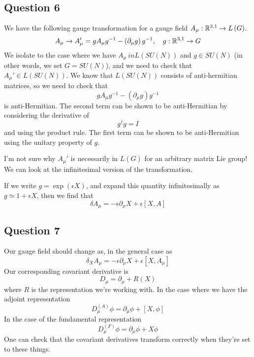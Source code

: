 \pagebreak 
\subsection{Question 6}
We have the following 
gauge transformation for a gauge field $ A _ \mu  : \mathbb{R} ^{ 3, 1 } \to L \left( G  \right)  $. 
\[
	A_ \mu \to A _ \mu  '  = g A _ \mu g ^{ - 1 }  - \left(  \partial  _ \mu g  \right)  g ^{ - 1 }, 
	\quad g : \mathbb{R} ^{ 3, 1 } \to  G 
\] We isolate to the case where 
we have $ A_ \mu   \ in L ( SU ( N ))$ and $ g \in SU ( N )  $ (in other words, 
we set $ G  = SU (N )$), and we need to 
check that $ A_ \mu  ' \in L \left(  SU ( N )  \right)   $. 
We know that $ L \left(  SU \left(  N   \right)   \right)  $ 
consists of anti-hermitian matrices, so we need to check that 
\[
  g A _ \mu g ^{ - 1 }  - \left(  \partial  _ \mu g  \right)  g ^{ - 1 } 
\] is anti-Hermitian. The second term can be shown to be 
anti-Hermitian by considering the derivative of 
\[
 g ^\dagger g  = I  
\] and using the product rule. The first term can 
be shown to be anti-Hermitian using the unitary 
property of $ g $. 

I'm not sure why $ A_ \mu  ' $ is necessarily in 
$ L \left(  G  \right) $ for an arbitrary matrix 
Lie group! We can look at the infinitesimal 
version of the transformation. 

If we write $ g  = \exp\left(  \epsilon  X  \right)  $, 
and expand this quantity infinitesimally as $ g 
\simeq 1  + \epsilon   X $, then we find that 
\[
\delta A _ \mu  =  - \epsilon \partial  _ \mu X + \epsilon \left[  X, A  \right] 
\] 

\pagebreak

\subsection{Question 7}
Our gauge field should 
change as, in the general case as 
\[
 \delta _ X A _ \mu  = - \epsilon \partial  _ \mu X + \epsilon \left[  X, A _ \mu  \right] 
\]
Our corresponding covariant derivative is 
\[
	D_ \mu  = \partial _ \mu  + R ( X ) 
\] where $ R $ is the representation we're working with. 
In the case where we have the adjoint representation
\[
	D ^{ \left(  A  \right)  } _ \mu \phi  = \partial  _ \mu \phi + 
	\left[  X, \phi  \right]  
\] In the case of the fundamental representation 
\[
	D ^{ \left( F  \right)  } _ \mu \phi
	 = \partial  _ \mu \phi + X \phi 
\] One can check that the covariant 
derivatives transform correctly when they're set to these things. 

